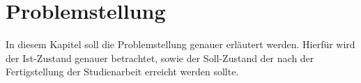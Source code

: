 \chapter{Problemstellung}
In diesem Kapitel soll die Problemstellung genauer erläutert werden. Hierfür wird der Ist-Zustand genauer betrachtet, sowie der Soll-Zustand der nach der Fertigstellung der Studienarbeit erreicht werden sollte. 



